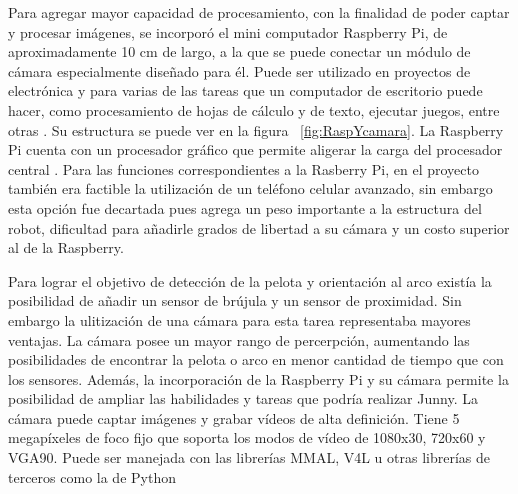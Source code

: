 Para agregar mayor capacidad de procesamiento, con la finalidad de poder captar y procesar imágenes, se incorpor\'o el mini computador Raspberry Pi, de aproximadamente 10 cm de largo, a la que se puede conectar un módulo de cámara especialmente diseñado para él. Puede ser utilizado en proyectos de electrónica y para varias de las tareas que un computador de escritorio puede hacer, como procesamiento de hojas de cálculo y de texto, ejecutar juegos, entre otras \cite{raspberry}. Su estructura se puede ver en la figura ~\ref{fig:RaspYcamara}. La Raspberry Pi cuenta con un procesador gráfico que permite aligerar la carga del procesador central \cite{elLinux}. Para las funciones correspondientes a la Rasberry Pi, en el proyecto tambi\'en era factible la utilizaci\'on de un tel\'efono celular avanzado, sin embargo esta opci\'on fue decartada pues agrega un peso importante a la estructura del robot, dificultad para añadirle grados de libertad a su cámara y un costo superior al de la Raspberry.  

Para lograr el objetivo de detecci\'on de la pelota y orientaci\'on al arco existía la posibilidad de añadir un sensor de br\'ujula y un sensor de proximidad. Sin embargo la ulitizaci\'on de una c\'amara para esta tarea representaba mayores ventajas. La cámara posee un mayor rango de percerpción, aumentando las posibilidades de encontrar la pelota o arco en menor cantidad de tiempo que con los sensores. Adem\'as, la incorporación de la Raspberry Pi y su cámara permite la posibilidad de ampliar las habilidades y tareas que podr\'ia realizar Junny. La c\'amara puede captar im\'agenes y grabar vídeos de alta definición. Tiene 5 megapíxeles de foco fijo que soporta los modos de vídeo de 1080x30, 720x60 y \gls{VGA}90. Puede ser manejada con las librerías \gls{MMAL}, \gls{V4L} u otras librerías de terceros como la de Python \cite{raspberrycam}


